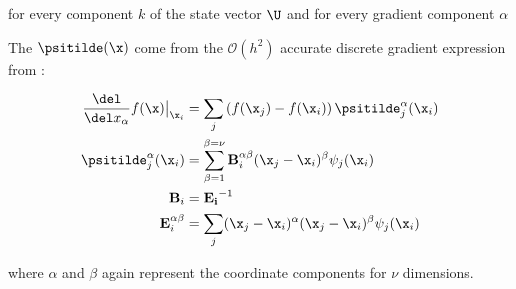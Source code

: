 for every component $k$ of the state vector $\U$ and for every gradient component $\alpha$

The $\psitilde(\x)$ come from the $\mathcal{O}(h^2)$ accurate discrete gradient expression from \cite{lansonRenormalizedMeshfreeSchemes2008}:

\begin{align}
	\frac{\del}{\del x_{\alpha}} f(\x) \big{|}_{\x_i} &= 
	\sum_j \left( f(\x_j) - f(\x_i) \right) \psitilde_j^\alpha (\x_i) 		\label{eq:gradient} \\
	\psitilde_j^\alpha (\x_i) &= \sum_{\beta = 1}^{\beta=\nu} \mathbf{B}_i^{\alpha \beta} 
	(\x_j - \x_i)^\beta \psi_j(\x_i) 	\\
	\mathbf{B}_i &= \mathbf{E_i} ^ {-1} \\ 
	\mathbf{E}_i^{\alpha \beta} &= \sum_j (\x_j - \x_i)^\alpha (\x_j - \x_i)^\beta \psi_j(\x_i)
\end{align}


where $\alpha$ and $\beta$ again represent the coordinate components for $\nu$ dimensions.

